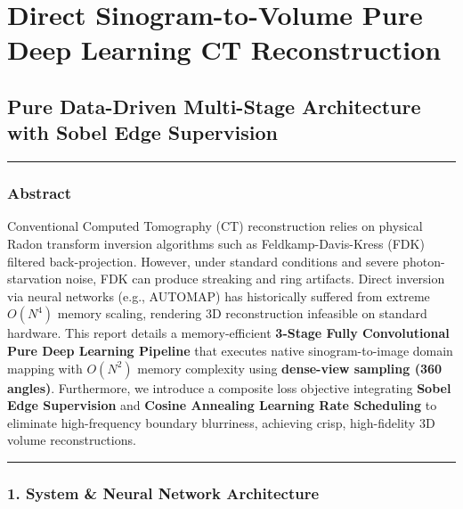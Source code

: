 \documentclass[
]{article}
\author{}
\date{}
\begin{document}
\section{Direct Sinogram-to-Volume Pure Deep Learning CT
Reconstruction}\label{direct-sinogram-to-volume-pure-deep-learning-ct-reconstruction}

\subsection{Pure Data-Driven Multi-Stage Architecture with Sobel Edge
Supervision}\label{pure data-driven-multi-stage-architecture-with-sobel-edge-supervision}

\begin{center}\rule{0.5\linewidth}{0.5pt}\end{center}

\subsubsection{Abstract}\label{abstract}

Conventional Computed Tomography (CT) reconstruction relies on physical
Radon transform inversion algorithms such as Feldkamp-Davis-Kress (FDK)
filtered back-projection. However, under standard conditions and severe
photon-starvation noise, FDK can produce streaking and ring artifacts.
Direct inversion via neural networks (e.g., AUTOMAP) has historically
suffered from extreme \(O(N^4)\) memory scaling, rendering 3D
reconstruction infeasible on standard hardware. This report details a
memory-efficient \textbf{3-Stage Fully Convolutional Pure Deep Learning
Pipeline} that executes native sinogram-to-image domain mapping with
\(O(N^2)\) memory complexity using \textbf{dense-view sampling (360
angles)}. Furthermore, we introduce a composite loss objective
integrating \textbf{Sobel Edge Supervision} and \textbf{Cosine Annealing
Learning Rate Scheduling} to eliminate high-frequency boundary
blurriness, achieving crisp, high-fidelity 3D volume reconstructions.

\begin{center}\rule{0.5\linewidth}{0.5pt}\end{center}

\subsubsection{1. System \& Neural Network
Architecture}\label{system-neural-network-architecture}
\end{document}
